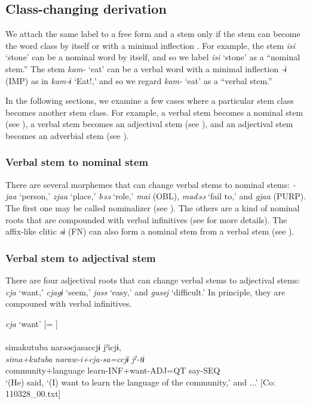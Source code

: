 \subsection{Class-changing derivation}\label{sec:4.3.8}

We attach the same label to a free form and a stem only if the stem can become the word class by itself or with a minimal inflection \citep[cf.][8]{Lehmann2008}. For example, the stem \textit{isi} ‘stone’ can be a nominal word by itself, and so we label \textit{isi} ‘stone’ as a “nominal stem.” The stem \textit{kam-} ‘eat’ can be a verbal word with a minimal inflection \textit{{}-ɨ} (IMP) as in \textit{kam-ɨ} ‘Eat!,’ and so we regard \textit{kam-} ‘eat’ as a “verbal stem.”

In the following sections, we examine a few cases where a particular stem class becomes another stem class. For example, a verbal stem becomes a nominal stem (see ), a verbal stem becomes an adjectival stem (see ), and an adjectival stem becomes an adverbial stem (see ).

\subsubsection{Verbal stem to nominal stem}\label{sec:4.3.8.1}

There are several morphemes that can change verbal stems to nominal stems: \textit{{}-jaa} ‘person,’ \textit{zjaa} ‘place,’ \textit{bəə} ‘role,’ \textit{mai} (OBL), \textit{madəə} ‘fail to,’ and \textit{gjaa} (PURP). The first one may be called nominalizer (see ). The others are a kind of nominal roots that are compounded with verbal infinitives (see  for more details). The affix-like clitic \textit{sɨ} (FN) can also form a nominal stem from a verbal stem (see ).

\subsubsection{Verbal stem to adjectival stem}\label{sec:4.3.8.2}

There are four adjectival roots that can change verbal stems to adjectival stems: \textit{cja} ‘want,’ \textit{cjagɨ} ‘seem,’ \textit{jass} ‘easy,’ and \textit{gussj} ‘difficult.’ In principle, they are compouned with verbal infinitives.

\ea \label{ex:4.59} \ea  \textit{cja} ‘want’ [= ] \label{ex:4.59a}\\\\
  \glll    simakutuba   narəəcjasaccjɨ  jˀicjɨ,\\
      \textit{sima+kutuba}  \textit{naraw-i+cja-sa=ccjɨ}  \textit{jˀ-tɨ}\\
      community+language  learn-INF+want-ADJ=QT  say-SEQ\\
      \glt       ‘(He) said, ‘(I) want to learn the language of the community,’ and ...’ [Co: 110328\_00.txt]


